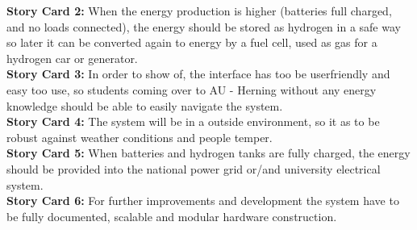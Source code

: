 \textbf{Story Card 2:} When the energy production is higher (batteries full
charged, and no loads connected), the energy should be stored as hydrogen in a safe way so
later it can be converted again to energy by a fuel cell, used as gas for a
hydrogen car or generator.\\
\newline
\textbf{Story Card 3:} In order to show of, the interface has too be userfriendly
and easy too use, so students coming over to AU - Herning without any energy
knowledge should be able to easily navigate the system.\\
\newline
\textbf{Story Card 4:} The system will be in a outside environment, so it as to
be robust against weather conditions and people temper.\\
\newline
\textbf{Story Card 5:} When batteries and hydrogen tanks are fully charged, the
energy should be provided into the national power grid or/and university electrical
system.\\
\newline
\textbf{Story Card 6:} For further improvements and development the system have
to be fully documented, scalable and modular hardware construction.\\
